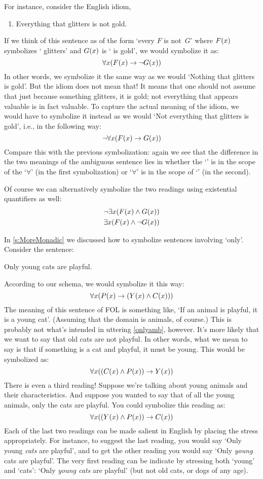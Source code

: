 For instance, consider the English idiom,
\begin{enumerate}
	\item\label{glitters}
	Everything that glitters is not gold.
\end{enumerate}
If we think of this sentence as of the form `every $F$ is not~$G$' where $F(x)$ symbolizes ` glitters' and $G(x)$ is ` is gold', we would symbolize it as:
\[\forall x(F(x) \rightarrow \neg G(x))\]
In other words, we symbolize it the same way as we would `Nothing that glitters is gold'. But the idiom does not mean that! It means that one should not assume that just because something glitters, it is gold; not everything that appears valuable is in fact valuable.  To capture the actual meaning of the idiom, we would have to symbolize it instead as we would `Not everything that glitters is gold', i.e., in the following way:
\[\neg\forall x(F(x) \rightarrow G(x))\]
Compare this with the previous symbolization: again we see that the difference in the two meanings of the ambiguous sentence lies in whether the `\enot' is in the scope of the `$\forall$' (in the first symbolization) or `$\forall$' is in the scope of `\enot' (in the second).

Of course we can alternatively symbolize the two readings using existential quantifiers as well:
\begin{align*}
	& \neg\exists x(F(x) \wedge G(x)) \\
	& \exists x(F(x) \wedge \neg G(x))
\end{align*}

In \cref{s:MoreMonadic} we discussed how to symbolize sentences involving `only'. Consider the sentence:
\begin{earg}
	\item\label{onlyamb} Only young cats are playful.
\end{earg} 
According to our schema, we would symbolize it this way:
\[
	\forall x(P(x) \rightarrow (Y(x) \wedge C(x)))
\]
The meaning of this sentence of FOL is something like, `If an animal is playful, it is a young cat'. (Assuming that the domain is animals, of course.) This is probably not what's intended in uttering \cref*{onlyamb}, however. It's more likely that we want to say that old cats are not playful. In other words, what we mean to say is that if something is a cat and playful, it must be young. This would be symbolized as:
\[
	\forall x((C(x) \wedge P(x)) \rightarrow Y(x))
\]
There is even a third reading! Suppose we're talking about young animals and their characteristics. And suppose you wanted to say that of all the young animals, only the cats are playful. You could symbolize this reading as:
\[
	\forall x((Y(x) \wedge P(x)) \rightarrow C(x))
\]
Each of the last two readings can be made salient in English by placing the stress appropriately. For instance, to suggest the last reading, you would say `Only young \emph{cats} are playful', and to get the other reading you would say `Only \emph{young} cats are playful'.  The very first reading can be indicate by stressing both `young' and `cats': `Only \emph{young cats} are playful' (but not old cats, or dogs of any age).

